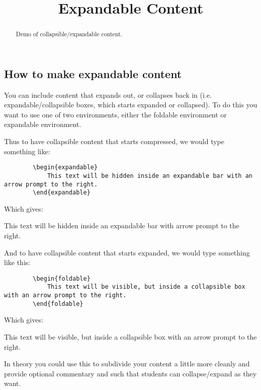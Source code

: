 \documentclass{ximera}
\title{Expandable Content}
\begin{document}
\begin{abstract}
    Demo of collapsible/expandable content.
\end{abstract}
\maketitle

\subsection*{How to make expandable content}
    You can include content that expands out, or collapses back in (i.e. expandable/collapsible boxes, which starts expanded or collapsed). To do this you want to use one of two environments, either the foldable environment or expandable environment.
    
    Thus to have collapsible content that starts compressed, we would type something like:
    \begin{verbatim}
        \begin{expandable}
            This text will be hidden inside an expandable bar with an arrow prompt to the right.
        \end{expandable}
    \end{verbatim}
    
    Which gives:

    \begin{expandable}
        This text will be hidden inside an expandable bar with arrow prompt to the right.
    \end{expandable}
        
    And to have collapsible content that starts expanded, we would type something like this:

    \begin{verbatim}
        \begin{foldable}
            This text will be visible, but inside a collapsible box with an arrow prompt to the right.
        \end{foldable}
    \end{verbatim}

    Which gives:

    \begin{foldable}
        This text will be visible, but inside a collapsible box with an arrow prompt to the right.
    \end{foldable}

    In theory you could use this to subdivide your content a little more cleanly and provide optional commentary and such that students can collapse/expand as they want. 
    
\end{document}
